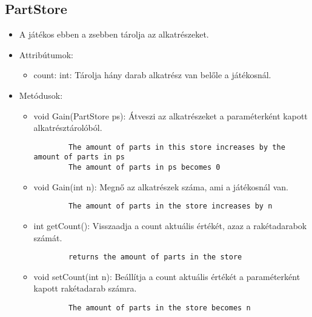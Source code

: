 \subsection{PartStore}
\begin{itemize}
	\item A játékos ebben a zsebben tárolja az alkatrészeket.
	\item Attribútumok:
	\begin{itemize}
		\item count: int: Tárolja hány darab alkatrész van belőle a játékosnál.
	\end{itemize}
	\item Metódusok:
	\begin{itemize}
		\item void Gain(PartStore ps): Átveszi az alkatrészeket a paraméterként kapott alkatrésztárolóból.
		\begin{lstlisting}
		The amount of parts in this store increases by the amount of parts in ps
		The amount of parts in ps becomes 0
		\end{lstlisting}
		\item void Gain(int n): Megnő az alkatrészek száma, ami a játékosnál van.
		\begin{lstlisting}
		The amount of parts in the store increases by n
		\end{lstlisting}
		\item int getCount(): Visszaadja a count aktuális értékét, azaz a rakétadarabok számát.
		\begin{lstlisting}
		returns the amount of parts in the store
		\end{lstlisting}
		\item void setCount(int n): Beállítja a count aktuális értékét a paraméterként kapott rakétadarab számra.
		\begin{lstlisting}
		The amount of parts in the store becomes n
		\end{lstlisting}
	\end{itemize}
\end{itemize}

